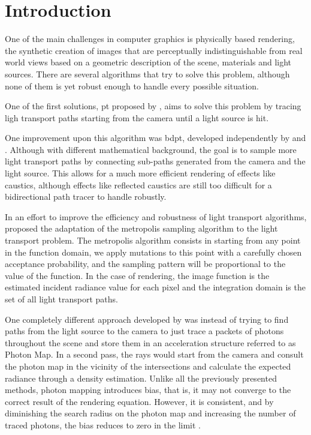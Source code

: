 \chapter{Introduction}

One of the main challenges in computer graphics is physically based rendering, the synthetic creation of images that are perceptually indistinguishable from real world views based on a geometric description of the scene, materials and light sources. There are several algorithms that try to solve this problem, although none of them is yet robust enough to handle every possible situation.

One of the first solutions, \gls{pt} proposed by \cite{Kajiya}, aims to solve this problem by tracing ligh transport paths starting from the camera until a light source is hit.

One improvement upon this algorithm was \gls{bdpt}, developed independently by \cite{Lafortune} and \cite{Veach}. Although with different mathematical background, the goal is to sample more light transport paths by connecting sub-paths generated from the camera and the light source. This allows for a much more efficient rendering of effects like caustics, although
effects like reflected caustics are still too difficult for a bidirectional path tracer to handle robustly.

In an effort to improve the efficiency and robustness of light transport algorithms, \cite{Veach} proposed the adaptation of the metropolis sampling algorithm to the light transport problem. The metropolis algorithm consists in starting from any point in the function domain, we apply mutations to this point with a carefully chosen acceptance probability, and the sampling pattern will be proportional to the value of the function. In the case of rendering, the image function is the estimated incident radiance value for each pixel and the integration domain is the set of all light transport paths.

One completely different approach developed by \cite{Jensen} was instead of trying to find paths from the light source to the camera to just trace a packets of photons throughout the scene and store them in an acceleration structure referred to as Photon Map. In a second pass, the rays would start from the camera and consult the photon map in the vicinity of the intersections and calculate the expected radiance through a density estimation. Unlike all the previously presented methods, photon mapping introduces bias, that is, it may not converge to the correct result of the rendering equation. However, it is consistent, and by diminishing the search radius on the photon map and increasing the number of traced photons, the bias reduces to zero in the limit \citep{Hachisuka}.

